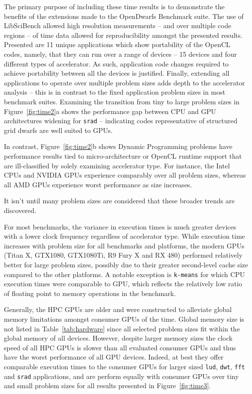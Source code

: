 \documentclass[../document.tex]{subfiles}
\begin{document}
The primary purpose of including these time results is to demonstrate the benefits of the extensions made to the OpenDwarfs Benchmark suite.
The use of LibSciBench allowed high resolution measurements -- and over multiple code regions -- of time data allowed for reproducibility amongst the presented results.
Presented are 11 unique applications which show portability of the OpenCL codes, namely, that they can run over a range of devices -- 15 devices and four different types of accelerator.
As such, application code changes required to achieve portability between all the devices is justified.
Finally, extending all applications to operate over multiple problem sizes adds depth to the accelerator analysis -- this is in contrast to the fixed application problem sizes in most benchmark suites.
Examining the transition from tiny to large problem sizes in Figure~\ref{fig:time2}a shows the performance gap between CPU and GPU architectures widening for {\tt srad} -- indicating codes representative of structured grid dwarfs are well suited to GPUs.

In contrast, Figure~\ref{fig:time2}b shows Dynamic Programming problems have performance results tied to micro-architecture or OpenCL runtime support that are ill-classified by solely examining accelerator type.
For instance, the Intel CPUs and NVIDIA GPUs experience comparably over all problem sizes, whereas all AMD GPUs experience worst performance as size increases.

It isn't until many problem sizes are considered that these broader trends are discovered.

For most benchmarks, the variance in execution times is much greater devices with a lower clock frequency regardless of accelerator type.
While execution time increases with problem size for all benchmarks and platforms, the modern GPUs (Titan X, GTX1080, GTX1080Ti, R9 Fury X and RX 480) performed relatively better for large problem sizes, possibly due to their greater second-level cache size compared to the other platforms.
A notable exception is {\tt k-means} for which CPU execution times were comparable to GPU, which reflects the relatively low ratio of floating point to memory operations in the benchmark.

Generally, the HPC GPUs are older and were constructed to alleviate global memory limitations amongst consumer GPUs of the time.
Global memory size is not listed in Table~\ref{tab:hardware} since all selected problem sizes fit within the global memory of all devices.
However, despite larger memory sizes the clock speed of all HPC GPUs is slower than all evaluated consumer GPUs and thus have the worst performance of all GPU devices.
Indeed, at best they offer comparable execution times to the consumer GPUs for larger sized {\tt lud}, {\tt dwt}, {\tt fft} and {\tt srad} applications, and are perform equally with consumer GPUs over tiny and small problem sizes for all results presented in Figure~\ref{fig:time3}.
\end{document}
